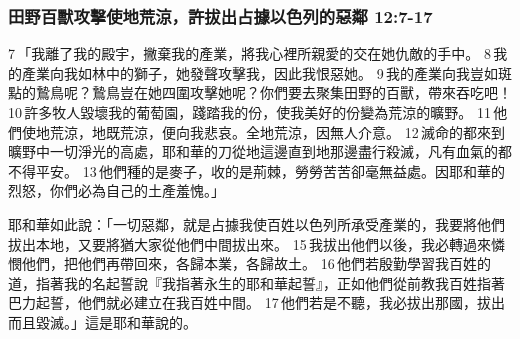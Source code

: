 \subsubsection{田野百獸攻擊使地荒涼，許拔出占據以色列的惡鄰 12:7-17}
7 「我離了我的殿宇，撇棄我的產業，將我心裡所親愛的交在她仇敵的手中。 8 我的產業向我如林中的獅子，她發聲攻擊我，因此我恨惡她。 9 我的產業向我豈如斑點的鷙鳥呢？鷙鳥豈在她四圍攻擊她呢？你們要去聚集田野的百獸，帶來吞吃吧！ 10 許多牧人毀壞我的葡萄園，踐踏我的份，使我美好的份變為荒涼的曠野。 11 他們使地荒涼，地既荒涼，便向我悲哀。全地荒涼，因無人介意。 12 滅命的都來到曠野中一切淨光的高處，耶和華的刀從地這邊直到地那邊盡行殺滅，凡有血氣的都不得平安。 13 他們種的是麥子，收的是荊棘，勞勞苦苦卻毫無益處。因耶和華的烈怒，你們必為自己的土產羞愧。」

耶和華如此說：「一切惡鄰，就是占據我使百姓以色列所承受產業的，我要將他們拔出本地，又要將猶大家從他們中間拔出來。 15 我拔出他們以後，我必轉過來憐憫他們，把他們再帶回來，各歸本業，各歸故土。 16 他們若殷勤學習我百姓的道，指著我的名起誓說『我指著永生的耶和華起誓』，正如他們從前教我百姓指著巴力起誓，他們就必建立在我百姓中間。 17 他們若是不聽，我必拔出那國，拔出而且毀滅。」這是耶和華說的。




